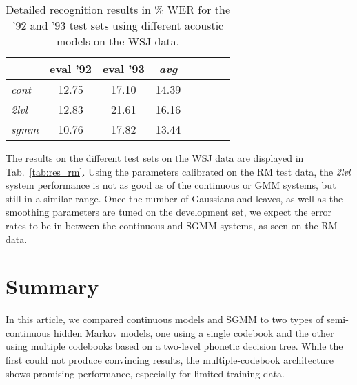 \documentclass{article}
\begin{document}
\begin{table}%
\begin{center}
\begin{tabular}{|l||c|c|c|c|c|c||c|}
\hline
~          & eval '92 & eval '93 & {\em avg} \\ \hline\hline
{\em cont} &    12.75 &    17.10 &     14.39 \\ \hline %


{\em 2lvl} &    12.83 &    21.61 &     16.16 \\ \hline

{\em sgmm} &    10.76 &    17.82 &     13.44 \\ \hline %
\end{tabular}
\end{center}
\caption{\label{tab:res_wsj}
Detailed recognition results in \% WER for the '92 and '93 test sets using 
different acoustic models on the WSJ data.
}
\end{table}

The results on the different test sets on the WSJ data are displayed in
Tab.~\ref{tab:res_rm}.
Using the parameters calibrated on the RM test data, the {\em 2lvl} system
performance is not as good as of the continuous or GMM systems, but still
in a similar range. Once the number of Gaussians and leaves, as well as the
smoothing parameters are tuned on the development set, we expect the error
rates to be in between the continuous and SGMM systems, as seen on the RM 
data.

\section{Summary}
In this article, we compared continuous models and SGMM to 
two types of semi-continuous hidden Markov models, one using a single codebook 
and the other using multiple codebooks based on a two-level phonetic decision tree.
%
While the first could not produce convincing results, the multiple-codebook 
architecture shows promising performance, especially for limited training data. 
\end{document}
